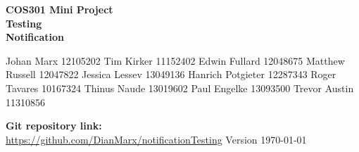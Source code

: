 \begin{titlepage}
	\begin{center}		
		\textbf{\LARGE COS301 Mini Project \\\textbf{Testing}\\}
		\vspace{1 cm}
		\LARGE{\textbf{Notification}}
			\begin{flushright} \large
				Johan Marx 12105202\newline
				Tim Kirker 11152402\newline
				Edwin Fullard 12048675\newline
				Matthew Russell 12047822\newline
				Jessica Lessev 13049136\newline		
				Hanrich Potgieter 12287343\newline
				Roger Tavares 10167324\newline
				Thinus Naude 13019602\newline
				Paul Engelke 13093500\newline
				Trevor Austin 11310856\newline
			\end{flushright}
		\vfill
		\textbf{Git repository link:\\}
		\url{https://github.com/DianMarx/notificationTesting}
		\vfill
		{\LARGE Version}
		{\large \today}			
	\end{center}
\end{titlepage}
